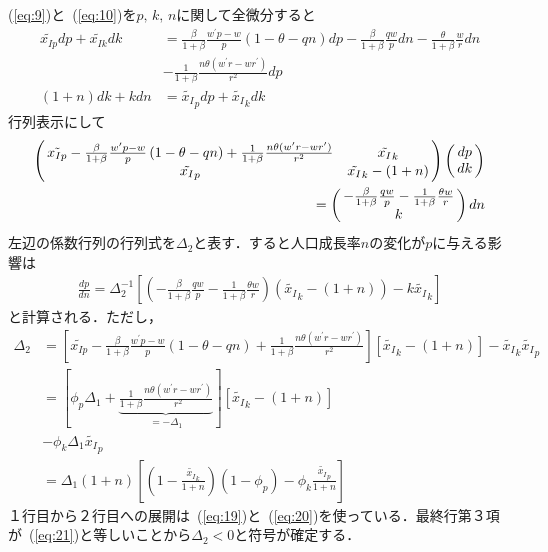 \documentclass[12pt,a4paper]{jsarticle}
\begin{document}
(\ref{eq:9})と~(\ref{eq:10})を$p, \, k, \, n$に関して全微分すると
\begin{align}
 \tilde{x_{Ip}} dp + \tilde{x_{Ik}} dk &= \frac{\beta}{1+\beta} \frac{w^{\prime}p - w}{p}\left(1-\theta - qn \right) dp - \frac{\beta}{1+\beta}\frac{q w }{p} dn - \frac{\theta}{1+\beta}\frac{w}{r}dn \nonumber \\
&- \frac{1}{1+\beta}\frac{n \theta (w^{\prime}r - wr^{\prime})}{r^{2}} dp \\
(1+n) dk + k dn &=\tilde{x_{I}}_{p} dp + \tilde{x_{I}}_{k} dk
\end{align}
行列表示にして
\begin{eqnarray*}
 \left(
\begin{array}{@{\,} cc @{\,}}
 \tilde{x_{Ip}} -\frac{\beta}{1+\beta} \frac{w^{\prime}p - w}{p}\left(1-\theta - qn \right) + \frac{1}{1+\beta}\frac{n \theta (w^{\prime}r - wr^{\prime})}{r^{2}} &  \tilde{x_{I}}_{k}  \\
\tilde{x_{I}}_{p} & \tilde{x_{I}}_{k} - (1+n) 
\end{array} 
\right)
\left(
\begin{array}{@{\,} c @{\,}}
dp \\
dk
\end{array} 
\right)
\\ =
\left(
\begin{array}{@{\,} c @{\,}}
 -\frac{\beta}{1+\beta}\frac{q w }{p} -\frac{1}{1+\beta}\frac{\theta w }{r} \\
k
\end{array} 
\right) dn
 \label{yakob} 
\end{eqnarray*}
左辺の係数行列の行列式を$\Delta_{2}$と表す．すると人口成長率$n$の変化が$p$に与える影響は
\begin{align}
 \frac{dp}{dn} = \Delta_{2}^{-1} \left[\left(-\frac{\beta}{1+\beta}\frac{qw}{p} - \frac{1}{1+\beta} \frac{\theta w}{r} \right)\left(\tilde{x_{I}}_{k} - (1+n)\right) - k \tilde{x_{I}}_k\right] \label{eq:27}
\end{align}
と計算される．ただし，
\begin{align}
 \Delta_{2} &= \left[\tilde{x_{Ip}} -\frac{\beta}{1+\beta} \frac{w^{\prime}p - w}{p}\left(1-\theta - qn \right) + \frac{1}{1+\beta}\frac{n \theta (w^{\prime}r - wr^{\prime})}{r^{2}}\right] \left[\tilde{x_{I}}_{k} - (1+n)  \right] - \tilde{x_{I}}_{k}\tilde{x_{I}}_{p} \nonumber \\
&=  \left[ \phi_{p} \Delta_{1}+ \underbrace{ \frac{1}{1+\beta}\frac{n \theta (w^{\prime}r - wr^{\prime})}{r^{2}}}_{=-\Delta_{1}}\right] \left[\tilde{x_{I}}_{k} - (1+n)  \right] \nonumber \\
&- \phi_{k} \Delta_{1} \tilde{x_{I}}_{p} \nonumber \\
& = \Delta_{1} (1+n) \left[\left(1 - \frac{\tilde{x_{I}}_{k}}{1+n} \right)\left(1 - \phi_{p} \right) - \phi_{k} \frac{\tilde{x_{I}}_{p}}{1+n} \right]
\end{align}
１行目から２行目への展開は~(\ref{eq:19})と~(\ref{eq:20})を使っている．最終行第３項が~(\ref{eq:21})と等しいことから$\Delta_{2}<0$と符号が確定する．
\end{document}
